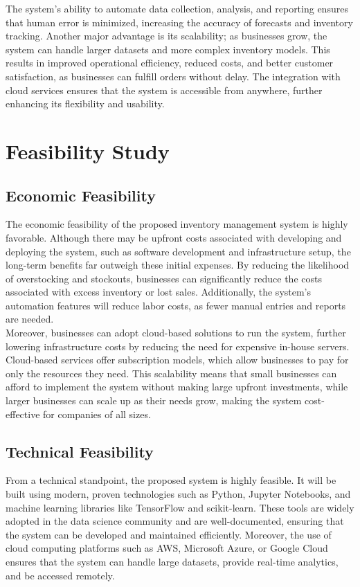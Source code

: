 \documentclass[10pt]{report}
\begin{document}
\begin{center}
The system's ability to automate data collection, analysis, and reporting ensures that human error is minimized, increasing the accuracy of forecasts and inventory tracking. Another major advantage is its scalability; as businesses grow, the system can handle larger datasets and more complex inventory models. This results in improved operational efficiency, reduced costs, and better customer satisfaction, as businesses can fulfill orders without delay. The integration with cloud services ensures that the system is accessible from anywhere, further enhancing its flexibility and usability.

\section{Feasibility Study}

\subsection{Economic Feasibility}
The economic feasibility of the proposed inventory management system is highly favorable. Although there may be upfront costs associated with developing and deploying the system, such as software development and infrastructure setup, the long-term benefits far outweigh these initial expenses. By reducing the likelihood of overstocking and stockouts, businesses can significantly reduce the costs associated with excess inventory or lost sales. Additionally, the system's automation features will reduce labor costs, as fewer manual entries and reports are needed.\\

Moreover, businesses can adopt cloud-based solutions to run the system, further lowering infrastructure costs by reducing the need for expensive in-house servers. Cloud-based services offer subscription models, which allow businesses to pay for only the resources they need. This scalability means that small businesses can afford to implement the system without making large upfront investments, while larger businesses can scale up as their needs grow, making the system cost-effective for companies of all sizes.

\subsection{Technical Feasibility}
From a technical standpoint, the proposed system is highly feasible. It will be built using modern, proven technologies such as Python, Jupyter Notebooks, and machine learning libraries like TensorFlow and scikit-learn. These tools are widely adopted in the data science community and are well-documented, ensuring that the system can be developed and maintained efficiently. Moreover, the use of cloud computing platforms such as AWS, Microsoft Azure, or Google Cloud ensures that the system can handle large datasets, provide real-time analytics, and be accessed remotely.\\


\end{center}
\end{document}
